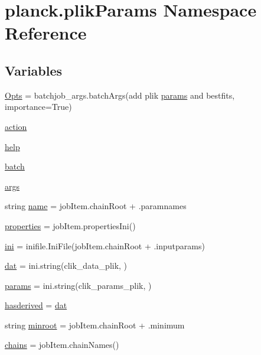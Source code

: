 \hypertarget{namespaceplanck_1_1plikParams}{}\section{planck.\+plik\+Params Namespace Reference}
\label{namespaceplanck_1_1plikParams}
\subsection*{Variables}
\begin{DoxyCompactItemize}
\item 
\mbox{\hyperlink{namespaceplanck_1_1plikParams_ae5bb3a30fbc6ae00e0efe71c5ffa1974}{Opts}} = batchjob\+\_\+args.\+batch\+Args(\textquotesingle{}add plik \mbox{\hyperlink{namespaceplanck_1_1plikParams_af9073d9caf9bc7875b6ec7ec8e88a4b7}{params}} and bestfits\textquotesingle{}, importance=True)
\item 
\mbox{\hyperlink{namespaceplanck_1_1plikParams_ad6f961bbe53f3ddef46ca3b1711dda54}{action}}
\item 
\mbox{\hyperlink{namespaceplanck_1_1plikParams_a5690f2073abd6a60c82362a366419634}{help}}
\item 
\mbox{\hyperlink{namespaceplanck_1_1plikParams_abe37c2cb7b9a48fe79f40ecfb1792251}{batch}}
\item 
\mbox{\hyperlink{namespaceplanck_1_1plikParams_a0a8b884009b718cfc4e4a0f503324d55}{args}}
\item 
string \mbox{\hyperlink{namespaceplanck_1_1plikParams_a24d892145f9bb0aa823fb7085ea988a4}{name}} = job\+Item.\+chain\+Root + \textquotesingle{}.paramnames\textquotesingle{}
\item 
\mbox{\hyperlink{namespaceplanck_1_1plikParams_a95dabed924ae43ab2fd441509f4e1bd2}{properties}} = job\+Item.\+properties\+Ini()
\item 
\mbox{\hyperlink{namespaceplanck_1_1plikParams_a163e2437935ee00d1a46dad234b01303}{ini}} = inifile.\+Ini\+File(job\+Item.\+chain\+Root + \textquotesingle{}.inputparams\textquotesingle{})
\item 
\mbox{\hyperlink{namespaceplanck_1_1plikParams_acbc642885d90ab5df74748f372652e55}{dat}} = ini.\+string(\textquotesingle{}clik\+\_\+data\+\_\+plik\textquotesingle{}, \textquotesingle{}\textquotesingle{})
\item 
\mbox{\hyperlink{namespaceplanck_1_1plikParams_af9073d9caf9bc7875b6ec7ec8e88a4b7}{params}} = ini.\+string(\textquotesingle{}clik\+\_\+params\+\_\+plik\textquotesingle{}, \textquotesingle{}\textquotesingle{})
\item 
\mbox{\hyperlink{namespaceplanck_1_1plikParams_a9b3a116e14bbdfed20f7a2e333d1d7df}{hasderived}} = \mbox{\hyperlink{namespaceplanck_1_1plikParams_acbc642885d90ab5df74748f372652e55}{dat}}
\item 
string \mbox{\hyperlink{namespaceplanck_1_1plikParams_a87daab5b72c23b1eb54bd60ccfbe8dd2}{minroot}} = job\+Item.\+chain\+Root + \textquotesingle{}.minimum\textquotesingle{}
\item 
\mbox{\hyperlink{namespaceplanck_1_1plikParams_ad5cd4719023e17faa7dfaab5e2ec6d76}{chains}} = job\+Item.\+chain\+Names()
\end{DoxyCompactItemize}


